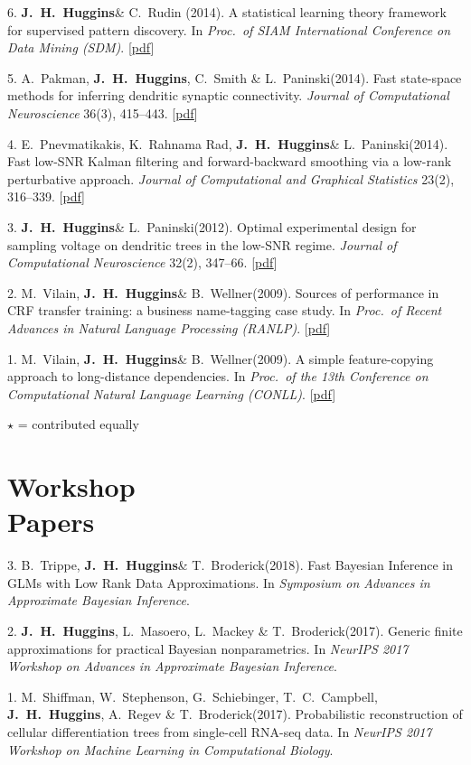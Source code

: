 \documentclass[margin,line]{res}
\newcommand{\me}{\textbf{J.~H.~Huggins}\xspace}
\newcommand{\trevor}{T.~C.~Campbell\xspace}
\newcommand{\tamara}{T.~Broderick\xspace}
\newcommand{\liam}{L.~Paninski\xspace}
\newcommand{\vhw}{M.~Vilain, \me \& B.~Wellner\xspace}
\newcommand{\paperref}[1]{[\href{#1}{pdf}]}
\newcommand{\paperref}[1]{}
\begin{document}
\begin{resume}
6. \me \& C.~Rudin (2014).
A statistical learning theory framework for supervised pattern discovery.
In {\em Proc.~of SIAM International Conference on Data Mining (SDM)}.
\paperref{http://www.jhhuggins.org/papers/HuRu-SDM-2014.pdf}

5. A.~Pakman, \me, C.~Smith \& \liam (2014).
Fast state-space methods for inferring dendritic synaptic connectivity.
{\em Journal of Computational Neuroscience} 36(3), 415--443.
\paperref{http://www.jhhuggins.org/papers/PHSP-JCNS-2014.pdf}

4. E.~Pnevmatikakis, K.~Rahnama Rad, \me \& \liam (2014).
Fast low-SNR Kalman filtering and forward-backward smoothing via a low-rank perturbative approach.
{\em Journal of Computational and Graphical Statistics} 23(2), 316--339. \paperref{http://www.jhhuggins.org/papers/PRHP-JCGS-2013.pdf}

3. \me \& \liam (2012).
Optimal experimental design for sampling voltage on dendritic trees in the low-SNR regime.
{\em Journal of Computational Neuroscience} 32(2), 347--66.
\paperref{http://www.jhhuggins.org/papers/HuPa-JCNS-2012.pdf}

2. \vhw (2009).
Sources of performance in CRF transfer training: a business name-tagging case study.
In {\em Proc.~of Recent Advances in Natural Language Processing (RANLP)}.
\paperref{http://www.jhhuggins.org/papers/VHW-RANLP-2009.pdf}

1. \vhw (2009).
A simple feature-copying approach to long-distance dependencies.
In {\em Proc.~of the 13th Conference on Computational Natural Language Learning (CONLL)}.
\paperref{http://www.jhhuggins.org/papers/VHW-CONLL-2009.pdf}

$\star$ = contributed equally

\section{\sc Workshop \\ Papers}

3. B.~Trippe, \me \& \tamara (2018).
Fast Bayesian Inference in GLMs with Low Rank Data Approximations.
In \emph{Symposium on Advances in Approximate Bayesian Inference}.

2. \me, L.~Masoero, L.~Mackey \& \tamara (2017).
Generic finite approximations for practical Bayesian nonparametrics.
In \emph{NeurIPS 2017 Workshop on Advances in Approximate Bayesian Inference}.

1. M.~Shiffman, W.~Stephenson, G.~Schiebinger, \trevor, \me, A.~Regev \& \tamara (2017).
Probabilistic reconstruction of cellular differentiation trees from single-cell RNA-seq data.
In \emph{NeurIPS 2017 Workshop on Machine Learning in Computational Biology}.


\end{resume}
\end{document}
